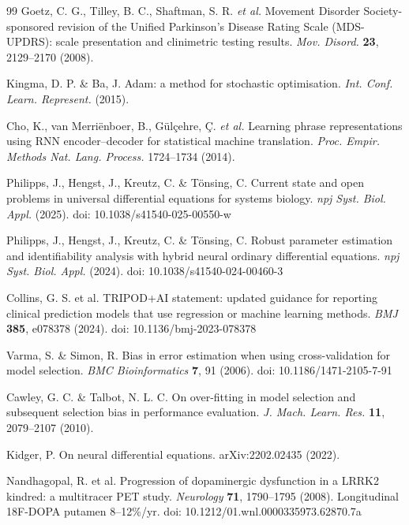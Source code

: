\begin{thebibliography}{99}
 Goetz, C. G., Tilley, B. C., Shaftman, S. R. \textit{et al.} Movement Disorder Society-sponsored revision of the Unified Parkinson's Disease Rating Scale (MDS-UPDRS): scale presentation and clinimetric testing results. \textit{Mov. Disord.} \textbf{23}, 2129--2170 (2008).

 Kingma, D. P. \& Ba, J. Adam: a method for stochastic optimisation. \textit{Int. Conf. Learn. Represent.} (2015).

 Cho, K., van Merri\"enboer, B., G\"ul\c{c}ehre, \c{C}. \textit{et al.} Learning phrase representations using RNN encoder--decoder for statistical machine translation. \textit{Proc. Empir. Methods Nat. Lang. Process.} 1724--1734 (2014).

 Philipps, J., Hengst, J., Kreutz, C. \& T\"onsing, C. Current state and open problems in universal differential equations for systems biology. \textit{npj Syst. Biol. Appl.} (2025). doi: 10.1038/s41540-025-00550-w

 Philipps, J., Hengst, J., Kreutz, C. \& T\"onsing, C. Robust parameter estimation and identifiability analysis with hybrid neural ordinary differential equations. \textit{npj Syst. Biol. Appl.} (2024). doi: 10.1038/s41540-024-00460-3

 Collins, G. S. et al. TRIPOD+AI statement: updated guidance for reporting clinical prediction models that use regression or machine learning methods. \textit{BMJ} \textbf{385}, e078378 (2024). doi: 10.1136/bmj-2023-078378

 Varma, S. \& Simon, R. Bias in error estimation when using cross-validation for model selection. \textit{BMC Bioinformatics} \textbf{7}, 91 (2006). doi: 10.1186/1471-2105-7-91

 Cawley, G. C. \& Talbot, N. L. C. On over-fitting in model selection and subsequent selection bias in performance evaluation. \textit{J. Mach. Learn. Res.} \textbf{11}, 2079--2107 (2010).

 Kidger, P. On neural differential equations. arXiv:2202.02435 (2022).

 Nandhagopal, R. et al. Progression of dopaminergic dysfunction in a LRRK2 kindred: a multitracer PET study. \textit{Neurology} \textbf{71}, 1790--1795 (2008). Longitudinal 18F-DOPA putamen 8--12\%/yr. doi: 10.1212/01.wnl.0000335973.62870.7a


\end{thebibliography}
